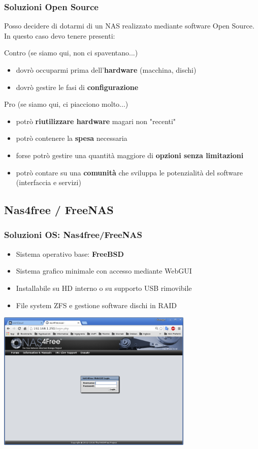 \documentclass[11pt,xcolor=table]{beamer}
\begin{document}
\begin{frame}
	\frametitle{Soluzioni Open Source}
	Posso decidere di dotarmi di un NAS realizzato mediante software Open Source. In questo caso devo tenere presenti:
	
	\begin{alertblock}{Contro (se siamo qui, non ci spaventano...)}
		\begin{itemize}
			\item dovrò occuparmi prima dell'\textbf{hardware} (macchina, dischi) 
			\item dovrò gestire le fasi di \textbf{configurazione}
		\end{itemize}
	\end{alertblock}
	
	\begin{exampleblock}{Pro (se siamo qui, ci piacciono molto...)}
		\begin{itemize}
			\item potrò \textbf{riutilizzare hardware} magari non "recenti"
			\item potrò contenere la \textbf{spesa} necessaria
			\item forse potrò gestire una quantità maggiore di \textbf{opzioni senza limitazioni}
			\item potrò contare su una \textbf{comunità} che sviluppa le potenzialità del software (interfaccia e servizi)
		\end{itemize}
	\end{exampleblock}
\end{frame}

\subsection{Nas4free / FreeNAS}

\begin{frame}
	\frametitle{Soluzioni OS: Nas4free/FreeNAS}
	\begin{itemize}
		\item Sistema operativo base: \textbf{FreeBSD}
		\item Sistema grafico minimale con accesso mediante WebGUI
		\item Installabile su HD interno o su supporto USB rimovibile
		\item File system ZFS e gestione software dischi in RAID
	\end{itemize}
	\centering
	\includegraphics[width=0.7\textwidth]{N4F/N4Fscreen.png}	
\end{frame}
\end{document}
